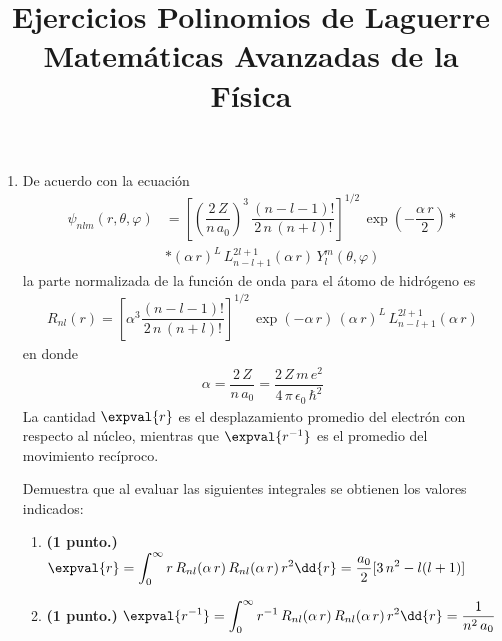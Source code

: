
\title{Ejercicios Polinomios de Laguerre\\ \large {Matemáticas Avanzadas de la Física}  \vspace{-1.5\baselineskip}}
\date{}
\author{}

\renewcommand\labelenumii{\theenumi.{\arabic{enumii})}}
\maketitle
\fontsize{14}{14}\selectfont
\begin{enumerate}
\item De acuerdo con la ecuación
\begin{align*}
\psi_{n l m} (r , \theta, \varphi) &= \left[ \left( \dfrac{2 \, Z}{n \, a_{0}} \right)^{3} \, \dfrac{(n - l -1)!}{2 \, n \, (n + l)!} \right]^{1/2} \, \exp \left( - \dfrac{\alpha \, r}{2} \right) * \\[1em]
&* (\alpha \, r)^{L} \, L_{n - l +1}^{2 l +1}(\alpha \, r) \, Y_{l}^{m} (\theta, \varphi)
\end{align*}
la parte normalizada de la función de onda para el átomo de hidrógeno es
\begin{align*}
R_{n l} (r) = \left[ \alpha^{3} \dfrac{(n -l -1)!}{2 \, n \, (n + l)!} \right]^{1/2} \, \exp \left( - \alpha \, r \right) \, (\alpha \, r)^{L} \, L_{n - l +1}^{2 l +1}(\alpha \, r) 
\end{align*}
en donde 
\begin{align*}
\alpha = \dfrac{2 \, Z}{n \, a_{0}} = \dfrac{2 \, Z \, m \, e^{2}}{4 \, \pi \, \epsilon_{0} \, \hbar^{2}}
\end{align*}
La cantidad $\expval{r}$ es el desplazamiento promedio del electrón con respecto al núcleo, mientras que $\expval{r^{-1}}$ es el promedio del movimiento recíproco.
\par
Demuestra que al evaluar las siguientes integrales se obtienen los valores indicados:
\begin{enumerate}
\item \textbf{(1 punto.) } $\displaystyle \expval{r} = \int_{0}^{\infty} r \, R_{n l} (\alpha \, r) \, R_{n l} (\alpha \, r) \, r^{2} \dd{r} = \dfrac{a_{0}}{2} [3 \, n^{2} - l (l + 1)]$
\item \textbf{(1 punto.) } $\displaystyle \expval{r^{-1}} = \int_{0}^{\infty} r^{-1} \, R_{n l} (\alpha \, r) \, R_{n l} (\alpha \, r) \, r^{2} \dd{r} = \dfrac{1}{n^{2} \, a_{0}}$
\end{enumerate}

\end{enumerate}
